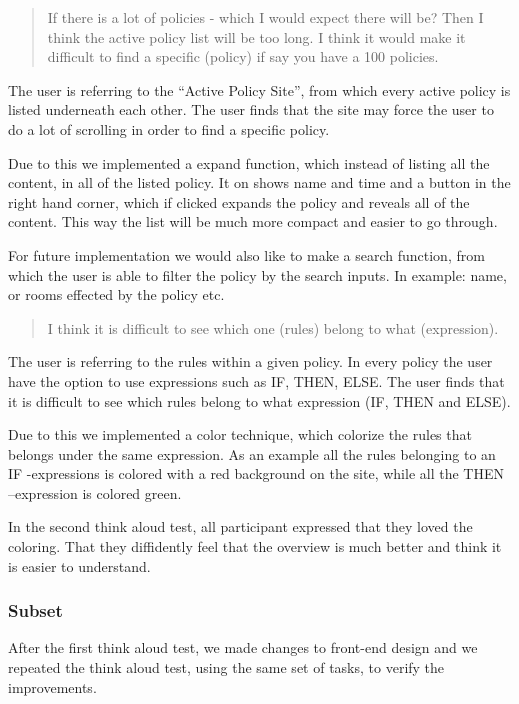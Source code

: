 \begin{quotation}
If there is a lot of policies - which I would expect there will be? Then I think the active policy list will be too long. I think it would make it difficult to find a specific (policy) if say you have a 100 policies.
\end{quotation}

The user is referring to the “Active Policy Site”, from which every active policy is listed underneath each other. The user finds that the site may force the user to do a lot of scrolling in order to find a specific policy.

Due to this we implemented a expand function, which instead of listing all the content, in all of the listed policy. It on shows name and time and a button in the right hand corner, which if clicked expands the policy and reveals all of the content. This way the list will be much more compact and easier to go through. 

For future implementation we would also like to make a search function, from which the user is able to filter the policy by the search inputs. In example: name, or rooms effected  by the policy etc.
 
\begin{quotation}
I think it is difficult to see which one (rules) belong to what (expression).
\end{quotation}

The user is referring to the rules within a given policy. In every policy the user have the option to use expressions such as IF, THEN, ELSE. The user finds that it is difficult to see which rules belong to what expression (IF, THEN and ELSE).

Due to this we implemented a color technique, which colorize the rules that belongs under the same expression. As an example all the rules belonging to an IF -expressions is colored with a red background on the site, while all the THEN –expression is colored green.

In the second think aloud test, all participant expressed that they loved the coloring. That they diffidently feel that the overview is much better and think it is easier to understand.

\subsubsection{Subset}
After the first think aloud test, we made changes to front-end design and we repeated the think aloud test, using the same set of tasks, to verify the improvements. 

